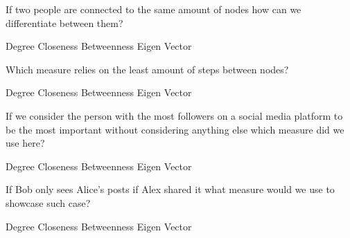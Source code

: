 \documentclass[theme=sleek, randomorder, hidesidemenu]{webquiz}
\begin{document}
\begin{question}
  If two people are connected to the same amount of nodes how can we differentiate between them?
  \begin{choice}
    \incorrect Degree
    \incorrect Closeness
    \incorrect Betweenness
    \correct Eigen Vector
  \end{choice}
\end{question}

\begin{question}
  Which measure relies on the least amount of steps between nodes?
  \begin{choice}
    \incorrect Degree
    \correct Closeness
    \incorrect Betweenness
    \incorrect Eigen Vector
  \end{choice}
\end{question}

\begin{question}
If we consider the person with the most followers on a social media platform to be the most important without considering anything else which measure did we use here?
  \begin{choice}
    \correct Degree
    \incorrect Closeness
    \incorrect Betweenness
    \incorrect Eigen Vector
  \end{choice}
\end{question}
\begin{question}
  If Bob only sees Alice's posts if Alex shared it what measure would we use to showcase such case?
  \begin{choice}
    \incorrect Degree
    \correct Closeness
    \incorrect Betweenness
    \incorrect Eigen Vector
  \end{choice}
\end{question}
\end{document}
